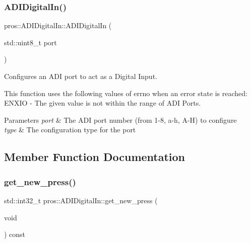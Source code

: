 \subsubsection{\texorpdfstring{A\+D\+I\+Digital\+In()}{ADIDigitalIn()}}
{\footnotesize\ttfamily pros\+::\+A\+D\+I\+Digital\+In\+::\+A\+D\+I\+Digital\+In (\begin{DoxyParamCaption}\item[{std\+::uint8\+\_\+t}]{port }\end{DoxyParamCaption})}



Configures an A\+DI port to act as a Digital Input. 

This function uses the following values of errno when an error state is reached\+: E\+N\+X\+IO -\/ The given value is not within the range of A\+DI Ports.


\begin{DoxyParams}{Parameters}
{\em port} & The A\+DI port number (from 1-\/8, \textquotesingle{}a\textquotesingle{}-\/\textquotesingle{}h\textquotesingle{}, \textquotesingle{}A\textquotesingle{}-\/\textquotesingle{}H\textquotesingle{}) to configure \\
\hline
{\em type} & The configuration type for the port \\
\hline
\end{DoxyParams}


\subsection{Member Function Documentation}
\mbox{\label{classpros_1_1ADIDigitalIn_a27d82a95e717eeee61ed6555952a93d8}} 
\subsubsection{\texorpdfstring{get\+\_\+new\+\_\+press()}{get\_new\_press()}}
{\footnotesize\ttfamily std\+::int32\+\_\+t pros\+::\+A\+D\+I\+Digital\+In\+::get\+\_\+new\+\_\+press (\begin{DoxyParamCaption}\item[{void}]{ }\end{DoxyParamCaption}) const}



